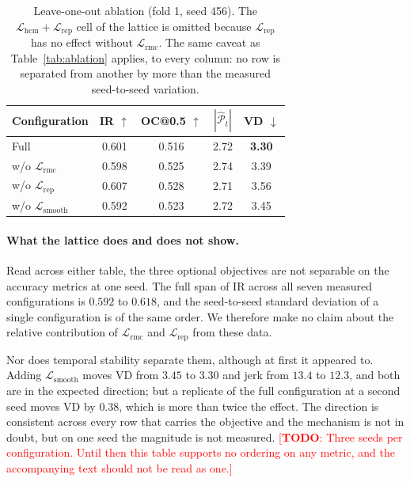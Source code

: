 \documentclass[preprint,12pt]{elsarticle}
\newcommand{\todo}[1]{\textcolor{red}{[\textbf{TODO}: #1]}}
\begin{document}
\begin{table}[t]
  \centering
  \caption{Leave-one-out ablation (fold 1, seed 456). The
  $\mathcal{L}_{\text{hcm}} + \mathcal{L}_{\text{rep}}$ cell of the lattice is
  omitted because $\mathcal{L}_{\text{rep}}$ has no effect without
  $\mathcal{L}_{\text{rmc}}$. The same caveat as Table~\ref{tab:ablation}
  applies, to every column: no row is separated from another by more than the
  measured seed-to-seed variation.}
  \label{tab:ablation_loo}
  \begin{tabular}{lcccc}
    \toprule
    Configuration & IR $\uparrow$ & OC@0.5 $\uparrow$ & $|\hat{\mathcal{P}}_t|$ & VD $\downarrow$ \\
    \midrule
    Full                                    & 0.601 & 0.516 & 2.72 & \textbf{3.30} \\
    w/o $\mathcal{L}_{\text{rmc}}$          & 0.598 & 0.525 & 2.74 & 3.39 \\
    w/o $\mathcal{L}_{\text{rep}}$          & 0.607 & 0.528 & 2.71 & 3.56 \\
    w/o $\mathcal{L}_{\text{smooth}}$       & 0.592 & 0.523 & 2.72 & 3.45 \\
    \bottomrule
  \end{tabular}
\end{table}

\paragraph{What the lattice does and does not show.} Read across either table,
the three optional objectives are not separable on the accuracy metrics at one
seed. The full span of IR across all seven measured configurations is $0.592$
to $0.618$, and the seed-to-seed standard deviation of a single configuration
is of the same order. We therefore make no claim about the relative
contribution of $\mathcal{L}_{\text{rmc}}$ and $\mathcal{L}_{\text{rep}}$ from
these data.

Nor does temporal stability separate them, although at first it appeared to.
Adding $\mathcal{L}_{\text{smooth}}$ moves VD from $3.45$ to $3.30$ and jerk
from $13.4$ to $12.3$, and both are in the expected direction; but a replicate
of the full configuration at a second seed moves VD by $0.38$, which is more
than twice the effect. The direction is consistent across every row that
carries the objective and the mechanism is not in doubt, but on one seed the
magnitude is not measured. \todo{Three seeds per configuration. Until then this
table supports no ordering on any metric, and the accompanying text should not
be read as one.}
\end{document}
